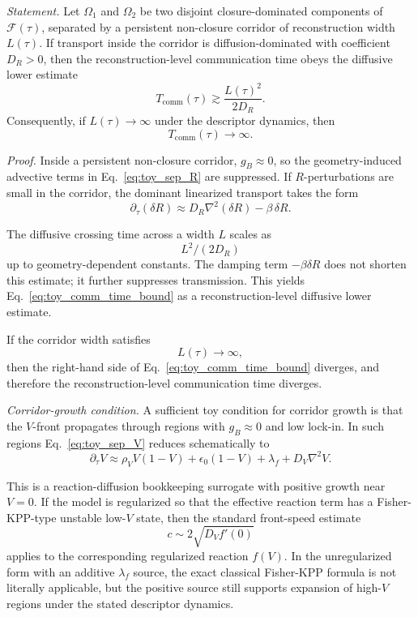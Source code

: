 \documentclass[aps,prx,onecolumn,11pt]{revtex4-2}
\theoremstyle{plain}
\theoremstyle{definition}
\theoremstyle{remark}
\begin{document}
\emph{Statement.}
Let \(\Omega_1\) and \(\Omega_2\) be two disjoint closure-dominated
components of \(\mathcal F(\tau)\), separated by a persistent
non-closure corridor of reconstruction width \(L(\tau)\). If transport
inside the corridor is diffusion-dominated with coefficient \(D_R>0\),
then the reconstruction-level communication time obeys the diffusive
lower estimate
\begin{equation}
T_{\mathrm{comm}}(\tau)
\gtrsim
\frac{L(\tau)^2}{2D_R}.
\label{eq:toy_comm_time_bound}
\end{equation}
Consequently, if \(L(\tau)\to\infty\) under the descriptor dynamics,
then
\[
T_{\mathrm{comm}}(\tau)\to\infty.
\]

\emph{Proof.}
Inside a persistent non-closure corridor, \(g_B\approx0\), so the
geometry-induced advective terms in Eq.~\eqref{eq:toy_sep_R} are
suppressed. If \(R\)-perturbations are small in the corridor, the
dominant linearized transport takes the form
\begin{equation}
\partial_\tau(\delta R)
\approx
D_R\nabla^2(\delta R)-\beta\,\delta R.
\label{eq:corridor_diffusion}
\end{equation}

The diffusive crossing time across a width \(L\) scales as
\[
L^2/(2D_R)
\]
up to geometry-dependent constants. The damping term \(-\beta\delta R\)
does not shorten this estimate; it further suppresses transmission.
This yields Eq.~\eqref{eq:toy_comm_time_bound} as a reconstruction-level
diffusive lower estimate.

If the corridor width satisfies
\[
L(\tau)\to\infty,
\]
then the right-hand side of Eq.~\eqref{eq:toy_comm_time_bound} diverges,
and therefore the reconstruction-level communication time diverges.

\emph{Corridor-growth condition.}
A sufficient toy condition for corridor growth is that the \(V\)-front
propagates through regions with \(g_B\approx0\) and low lock-in. In such
regions Eq.~\eqref{eq:toy_sep_V} reduces schematically to
\begin{equation}
\partial_\tau V
\approx
\rho_V V(1-V)
+\epsilon_0(1-V)
+\lambda_f
+D_V\nabla^2V.
\label{eq:V_corridor}
\end{equation}

This is a reaction-diffusion bookkeeping surrogate with positive
growth near \(V=0\). If the model is regularized so that the effective
reaction term has a Fisher-KPP-type unstable low-\(V\) state, then the
standard front-speed estimate
\[
c\sim 2\sqrt{D_V f'(0)}
\]
applies to the corresponding regularized reaction \(f(V)\). In the
unregularized form with an additive \(\lambda_f\) source, the exact
classical Fisher-KPP formula is not literally applicable, but the
positive source still supports expansion of high-\(V\) regions under
the stated descriptor dynamics.
\end{document}
